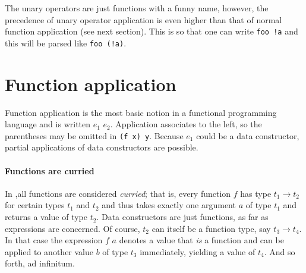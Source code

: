 The unary operators are just functions with a funny name, however, the precedence of unary operator application is even higher than that of normal function application (see next section). This is so that one can write \texttt{foo !a} and this will be parsed like \texttt{foo (!a)}.


\section{Function application}  \label{funapp} 

\begin{flushleft}
  \alt {} 
\end{flushleft}

Function application is the most basic notion in a functional programming language and is written $e_1$ $e_2$.
Application associates to the left, so the parentheses may be omitted in \texttt{(f x) y}.
Because $e_1$ could be a data constructor, partial applications of data constructors are possible.


\paragraph*{Functions are curried}

In \frege{},all functions are considered \emph{curried}; that is, every function $f$ has type $t_1 \rightarrow{} t_2$ for certain types $t_1$ and $t_2$ and thus takes exactly one argument $a$ of type $t_1$ and returns a value of type $t_2$.
Data constructors are just functions, as far as expressions are concerned.
Of course, $t_2$ can itself be a function type, say $t_3 \rightarrow{} t_4$.
In that case the expression $f$ $a$ denotes a value that \emph{is} a function and can be applied to another value $b$ of type $t_3$ immediately, yielding a value of $t_4$. And so forth, ad infinitum.

